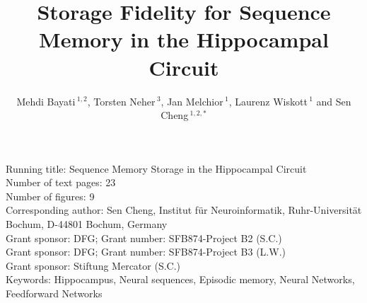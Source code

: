 \documentclass[utf8]{frontiersSCNS} %
\def\firstAuthorLast{} %
\def\Authors{Mehdi Bayati\,$^{1,2}$, Torsten Neher\,$^{3}$, Jan Melchior\,$^{1}$, Laurenz Wiskott\,$^{1}$ and Sen Cheng\,$^{1,2,*}$}
\begin{document}
\onecolumn
{}

\title{Storage Fidelity for Sequence Memory in the Hippocampal Circuit} 

\author[\firstAuthorLast ]{\Authors} %
\address{} %
\correspondance{} %

\extraAuth{}%


\maketitle
Running title: Sequence Memory Storage in the Hippocampal Circuit\\
Number of text pages: 23\\
Number of figures: 9\\
Corresponding author: Sen Cheng, Institut f\"ur Neuroinformatik, Ruhr-Universit\"at Bochum, D-44801 Bochum, Germany\\
Grant sponsor: DFG; Grant number: SFB874-Project B2 (S.C.)\\
Grant sponsor: DFG; Grant number: SFB874-Project B3 (L.W.)\\
Grant sponsor: Stiftung Mercator (S.C.)\\
Keywords: Hippocampus, Neural sequences, Episodic memory, Neural Networks, Feedforward Networks\\

\newpage

\linenumbers
\end{document}
